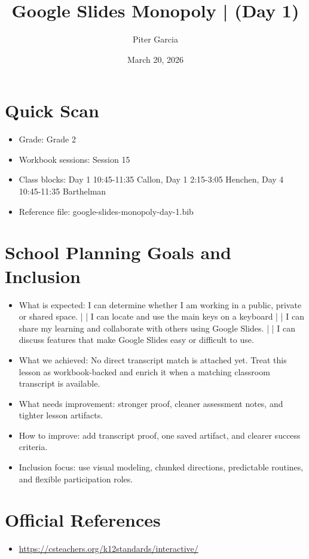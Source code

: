 \documentclass[11pt]{article}
\title{Google Slides Monopoly | (Day 1)}
\author{Piter Garcia}
\date{March 20, 2026}
\begin{document}
\maketitle
\section*{Quick Scan}
\begin{itemize}[leftmargin=*]
\item Grade: Grade 2
\item Workbook sessions: Session 15
\item Class blocks: Day 1 10:45-11:35 Callon, Day 1 2:15-3:05 Henchen, Day 4 10:45-11:35 Barthelman
\item Reference file: google-slides-monopoly-day-1.bib
\end{itemize}
\section*{School Planning Goals and Inclusion}
\begin{itemize}[leftmargin=*]
\item What is expected: I can determine whether I am working in a public, private or shared space. | | I can locate and use the main keys on a keyboard | | I can share my learning and collaborate with others using Google Slides. | | I can discuss features that make Google Slides easy or difficult to use.
\item What we achieved: No direct transcript match is attached yet. Treat this lesson as workbook-backed and enrich it when a matching classroom transcript is available.
\item What needs improvement: stronger proof, cleaner assessment notes, and tighter lesson artifacts.
\item How to improve: add transcript proof, one saved artifact, and clearer success criteria.
\item Inclusion focus: use visual modeling, chunked directions, predictable routines, and flexible participation roles.
\end{itemize}
\section*{Official References}
\begin{itemize}[leftmargin=*]
\item \url{https://csteachers.org/k12standards/interactive/}

\end{itemize}
\end{document}

